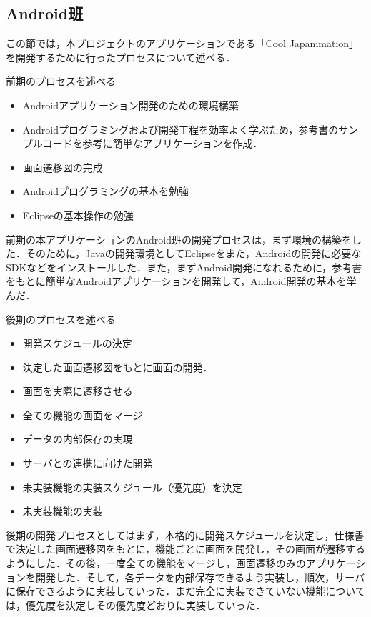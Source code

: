 \subsection{Android班}
\par この節では，本プロジェクトのアプリケーションである「Cool Japanimation」を開発するために行ったプロセスについて述べる．
\\
\par 前期のプロセスを述べる
\\
\begin{itemize}
\item Androidアプリケーション開発のための環境構築
\item Androidプログラミングおよび開発工程を効率よく学ぶため，参考書のサンプルコードを参考に簡単なアプリケーションを作成．
\item 画面遷移図の完成
\item Androidプログラミングの基本を勉強
\item Eclipseの基本操作の勉強
\end{itemize}

\par
前期の本アプリケーションのAndroid班の開発プロセスは，まず環境の構築をした．そのために，Javaの開発環境としてEclipseをまた，Androidの開発に必要なSDKなどをインストールした．また，まずAndroid開発になれるために，参考書をもとに簡単なAndroidアプリケーションを開発して，Android開発の基本を学んだ．

\par 後期のプロセスを述べる
\\
\begin{itemize}
\item 開発スケジュールの決定
\item 決定した画面遷移図をもとに画面の開発．
\item 画面を実際に遷移させる
\item 全ての機能の画面をマージ
\item データの内部保存の実現
\item サーバとの連携に向けた開発
\item 未実装機能の実装スケジュール（優先度）を決定
\item 未実装機能の実装
\end{itemize}

\par
後期の開発プロセスとしてはまず，本格的に開発スケジュールを決定し，仕様書で決定した画面遷移図をもとに，機能ごとに画面を開発し，その画面が遷移するようにした．その後，一度全ての機能をマージし，画面遷移のみのアプリケーションを開発した．そして，各データを内部保存できるよう実装し，順次，サーバに保存できるように実装していった．まだ完全に実装できていない機能については，優先度を決定しその優先度どおりに実装していった．

